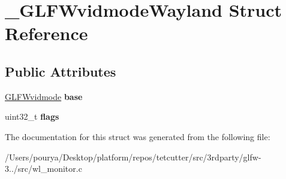 \hypertarget{struct__GLFWvidmodeWayland}{}\section{\+\_\+\+G\+L\+F\+Wvidmode\+Wayland Struct Reference}
\label{struct__GLFWvidmodeWayland}
\subsection*{Public Attributes}
\begin{DoxyCompactItemize}
\item 
\hypertarget{struct__GLFWvidmodeWayland_adea153af77dca327ea6277bd49ca1637}{}\hyperlink{structGLFWvidmode}{G\+L\+F\+Wvidmode} {\bfseries base}\label{struct__GLFWvidmodeWayland_adea153af77dca327ea6277bd49ca1637}

\item 
\hypertarget{struct__GLFWvidmodeWayland_ad63b3b1656ed55e87827f33ec0ebee1d}{}uint32\+\_\+t {\bfseries flags}\label{struct__GLFWvidmodeWayland_ad63b3b1656ed55e87827f33ec0ebee1d}

\end{DoxyCompactItemize}


The documentation for this struct was generated from the following file\+:\begin{DoxyCompactItemize}
\item 
/\+Users/pourya/\+Desktop/platform/repos/tetcutter/src/3rdparty/glfw-\/3../src/wl\+\_\+monitor.\+c\end{DoxyCompactItemize}
